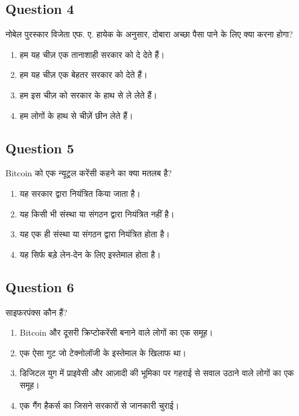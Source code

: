 \documentclass[12pt,a4paper]{article}
\begin{document}
\bigskip


\subsection*{Question 4}
नोबेल पुरस्कार विजेता एफ. ए. हायेक के अनुसार, दोबारा अच्छा पैसा पाने के लिए क्या करना होगा?

\begin{enumerate}[label=\Alph*., leftmargin=*]
\item हम यह चीज़ एक तानाशाही सरकार को दे देते हैं।
\item हम यह चीज़ एक बेहतर सरकार को देते हैं।
\item हम इस चीज़ को सरकार के हाथ से ले लेते हैं।
\item हम लोगों के हाथ से चीज़ें छीन लेते हैं।
\end{enumerate}

\bigskip


\subsection*{Question 5}
Bitcoin को एक न्यूट्रल करेंसी कहने का क्या मतलब है?

\begin{enumerate}[label=\Alph*., leftmargin=*]
\item यह सरकार द्वारा नियंत्रित किया जाता है।
\item यह किसी भी संस्था या संगठन द्वारा नियंत्रित नहीं है।
\item यह एक ही संस्था या संगठन द्वारा नियंत्रित होता है।
\item यह सिर्फ बड़े लेन-देन के लिए इस्तेमाल होता है।
\end{enumerate}

\bigskip


\subsection*{Question 6}
साइफरपंक्स कौन हैं?

\begin{enumerate}[label=\Alph*., leftmargin=*]
\item Bitcoin और दूसरी क्रिप्टोकरेंसी बनाने वाले लोगों का एक समूह।
\item एक ऐसा गुट जो टेक्नोलॉजी के इस्तेमाल के खिलाफ था।
\item डिजिटल युग में प्राइवेसी और आज़ादी की भूमिका पर गहराई से सवाल उठाने वाले लोगों का एक समूह।
\item एक गैंग हैकर्स का जिसने सरकारों से जानकारी चुराई।
\end{enumerate}
\end{document}
